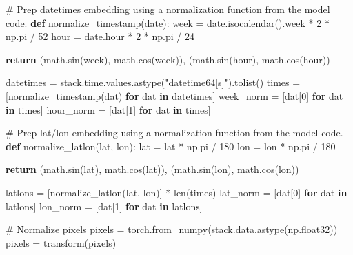\documentclass[
  letterpaper,
  DIV=11,
  numbers=noendperiod]{scrreprt}
\newenvironment{Shaded}{\begin{snugshade}}{\end{snugshade}}
\newcommand{\BuiltInTok}[1]{\textcolor[rgb]{0.00,0.23,0.31}{#1}}
\newcommand{\CommentTok}[1]{\textcolor[rgb]{0.37,0.37,0.37}{#1}}
\newcommand{\ControlFlowTok}[1]{\textcolor[rgb]{0.00,0.23,0.31}{\textbf{#1}}}
\newcommand{\DecValTok}[1]{\textcolor[rgb]{0.68,0.00,0.00}{#1}}
\newcommand{\KeywordTok}[1]{\textcolor[rgb]{0.00,0.23,0.31}{\textbf{#1}}}
\newcommand{\NormalTok}[1]{\textcolor[rgb]{0.00,0.23,0.31}{#1}}
\newcommand{\OperatorTok}[1]{\textcolor[rgb]{0.37,0.37,0.37}{#1}}
\newcommand{\StringTok}[1]{\textcolor[rgb]{0.13,0.47,0.30}{#1}}
\begin{document}
\begin{Shaded}
\begin{Highlighting}[]
\CommentTok{\# Prep datetimes embedding using a normalization function from the model code.}
\KeywordTok{def}\NormalTok{ normalize\_timestamp(date):}
\NormalTok{    week }\OperatorTok{=}\NormalTok{ date.isocalendar().week }\OperatorTok{*} \DecValTok{2} \OperatorTok{*}\NormalTok{ np.pi }\OperatorTok{/} \DecValTok{52}
\NormalTok{    hour }\OperatorTok{=}\NormalTok{ date.hour }\OperatorTok{*} \DecValTok{2} \OperatorTok{*}\NormalTok{ np.pi }\OperatorTok{/} \DecValTok{24}

    \ControlFlowTok{return}\NormalTok{ (math.sin(week), math.cos(week)), (math.sin(hour), math.cos(hour))}


\NormalTok{datetimes }\OperatorTok{=}\NormalTok{ stack.time.values.astype(}\StringTok{"datetime64[s]"}\NormalTok{).tolist()}
\NormalTok{times }\OperatorTok{=}\NormalTok{ [normalize\_timestamp(dat) }\ControlFlowTok{for}\NormalTok{ dat }\KeywordTok{in}\NormalTok{ datetimes]}
\NormalTok{week\_norm }\OperatorTok{=}\NormalTok{ [dat[}\DecValTok{0}\NormalTok{] }\ControlFlowTok{for}\NormalTok{ dat }\KeywordTok{in}\NormalTok{ times]}
\NormalTok{hour\_norm }\OperatorTok{=}\NormalTok{ [dat[}\DecValTok{1}\NormalTok{] }\ControlFlowTok{for}\NormalTok{ dat }\KeywordTok{in}\NormalTok{ times]}


\CommentTok{\# Prep lat/lon embedding using a normalization function from the model code.}
\KeywordTok{def}\NormalTok{ normalize\_latlon(lat, lon):}
\NormalTok{    lat }\OperatorTok{=}\NormalTok{ lat }\OperatorTok{*}\NormalTok{ np.pi }\OperatorTok{/} \DecValTok{180}
\NormalTok{    lon }\OperatorTok{=}\NormalTok{ lon }\OperatorTok{*}\NormalTok{ np.pi }\OperatorTok{/} \DecValTok{180}

    \ControlFlowTok{return}\NormalTok{ (math.sin(lat), math.cos(lat)), (math.sin(lon), math.cos(lon))}


\NormalTok{latlons }\OperatorTok{=}\NormalTok{ [normalize\_latlon(lat, lon)] }\OperatorTok{*} \BuiltInTok{len}\NormalTok{(times)}
\NormalTok{lat\_norm }\OperatorTok{=}\NormalTok{ [dat[}\DecValTok{0}\NormalTok{] }\ControlFlowTok{for}\NormalTok{ dat }\KeywordTok{in}\NormalTok{ latlons]}
\NormalTok{lon\_norm }\OperatorTok{=}\NormalTok{ [dat[}\DecValTok{1}\NormalTok{] }\ControlFlowTok{for}\NormalTok{ dat }\KeywordTok{in}\NormalTok{ latlons]}

\CommentTok{\# Normalize pixels}
\NormalTok{pixels }\OperatorTok{=}\NormalTok{ torch.from\_numpy(stack.data.astype(np.float32))}
\NormalTok{pixels }\OperatorTok{=}\NormalTok{ transform(pixels)}
\end{Highlighting}
\end{Shaded}
\end{document}
